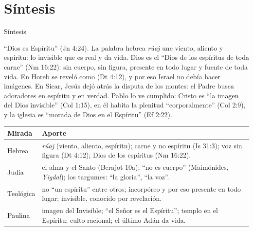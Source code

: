 \section{Síntesis}

\begin{frame}{Síntesis}
\begin{tcolorbox}[colback=papiro,colframe=azul,boxrule=1pt,arc=3pt]
\footnotesize ``Dios es Espíritu'' (Jn 4:24). La palabra hebrea \emph{rúaj} une viento, aliento y espíritu: lo invisible que es real y da vida. Dios es el ``Dios de los espíritus de toda carne'' (Nm 16:22): sin cuerpo, sin figura, presente en todo lugar y fuente de toda vida. En Horeb se reveló como  (Dt 4:12), y por eso Israel no debía hacer imágenes. En Sicar, Jesús dejó atrás la disputa de los montes: el Padre busca adoradores en espíritu y en verdad. Pablo lo ve cumplido: Cristo es ``la imagen del Dios invisible'' (Col 1:15), en él habita la plenitud ``corporalmente'' (Col 2:9), y la iglesia es ``morada de Dios en el Espíritu'' (Ef 2:22).
\end{tcolorbox}
\scriptsize\renewcommand{\arraystretch}{1.15}
\begin{tabular}{@{}>{\RaggedRight\arraybackslash}p{2.4cm}>{\RaggedRight\arraybackslash}p{9.4cm}@{}}
\toprule
\textbf{Mirada} & \textbf{Aporte} \\ \midrule
Hebrea & \emph{rúaj} (viento, aliento, espíritu); carne y no espíritu (Is 31:3); voz sin figura (Dt 4:12); Dios de los espíritus (Nm 16:22). \\
Judía & el alma y el Santo (Berajot 10a); ``no es cuerpo'' (Maimónides, \emph{Yigdal}); los targumes: ``la gloria'', ``la voz''. \\
Teológica & no ``un espíritu'' entre otros; incorpóreo y por eso presente en todo lugar; invisible, conocido por revelación. \\
Paulina & imagen del Invisible; ``el Señor es el Espíritu''; templo en el Espíritu; culto racional; el último Adán da vida. \\
\bottomrule
\end{tabular}
\end{frame}

